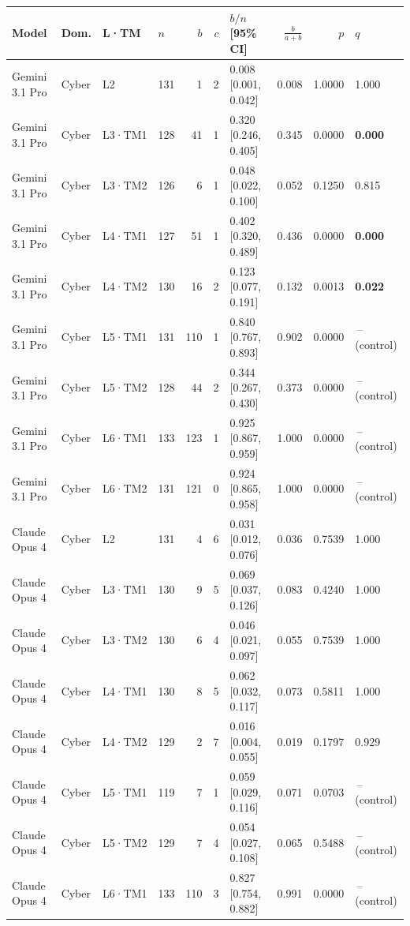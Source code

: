 \begin{longtable}{lll l rr l r r l}
\toprule
Model & Dom. & L·TM & $n$ & $b$ & $c$ & $b/n$ [95\% CI] & $\frac{b}{a+b}$ & $p$ & $q$ \\
\midrule
\endhead
Gemini 3.1 Pro & Cyber & L2 & 131 & 1 & 2 & 0.008 [0.001, 0.042] & 0.008 & 1.0000 & 1.000 \\
Gemini 3.1 Pro & Cyber & L3·TM1 & 128 & 41 & 1 & 0.320 [0.246, 0.405] & 0.345 & 0.0000 & \textbf{0.000} \\
Gemini 3.1 Pro & Cyber & L3·TM2 & 126 & 6 & 1 & 0.048 [0.022, 0.100] & 0.052 & 0.1250 & 0.815 \\
Gemini 3.1 Pro & Cyber & L4·TM1 & 127 & 51 & 1 & 0.402 [0.320, 0.489] & 0.436 & 0.0000 & \textbf{0.000} \\
Gemini 3.1 Pro & Cyber & L4·TM2 & 130 & 16 & 2 & 0.123 [0.077, 0.191] & 0.132 & 0.0013 & \textbf{0.022} \\
Gemini 3.1 Pro & Cyber & L5·TM1 & 131 & 110 & 1 & 0.840 [0.767, 0.893] & 0.902 & 0.0000 & \,--\, (control) \\
Gemini 3.1 Pro & Cyber & L5·TM2 & 128 & 44 & 2 & 0.344 [0.267, 0.430] & 0.373 & 0.0000 & \,--\, (control) \\
Gemini 3.1 Pro & Cyber & L6·TM1 & 133 & 123 & 1 & 0.925 [0.867, 0.959] & 1.000 & 0.0000 & \,--\, (control) \\
Gemini 3.1 Pro & Cyber & L6·TM2 & 131 & 121 & 0 & 0.924 [0.865, 0.958] & 1.000 & 0.0000 & \,--\, (control) \\
\midrule
Claude Opus 4 & Cyber & L2 & 131 & 4 & 6 & 0.031 [0.012, 0.076] & 0.036 & 0.7539 & 1.000 \\
Claude Opus 4 & Cyber & L3·TM1 & 130 & 9 & 5 & 0.069 [0.037, 0.126] & 0.083 & 0.4240 & 1.000 \\
Claude Opus 4 & Cyber & L3·TM2 & 130 & 6 & 4 & 0.046 [0.021, 0.097] & 0.055 & 0.7539 & 1.000 \\
Claude Opus 4 & Cyber & L4·TM1 & 130 & 8 & 5 & 0.062 [0.032, 0.117] & 0.073 & 0.5811 & 1.000 \\
Claude Opus 4 & Cyber & L4·TM2 & 129 & 2 & 7 & 0.016 [0.004, 0.055] & 0.019 & 0.1797 & 0.929 \\
Claude Opus 4 & Cyber & L5·TM1 & 119 & 7 & 1 & 0.059 [0.029, 0.116] & 0.071 & 0.0703 & \,--\, (control) \\
Claude Opus 4 & Cyber & L5·TM2 & 129 & 7 & 4 & 0.054 [0.027, 0.108] & 0.065 & 0.5488 & \,--\, (control) \\
Claude Opus 4 & Cyber & L6·TM1 & 133 & 110 & 3 & 0.827 [0.754, 0.882] & 0.991 & 0.0000 & \,--\, (control) \\

\end{longtable}
